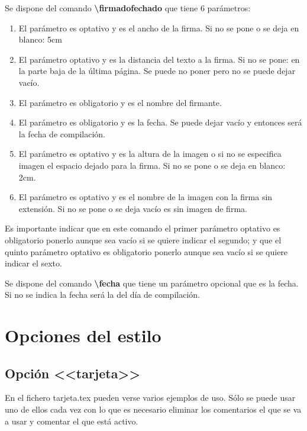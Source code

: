 \documentclass[numerado,carta]{plantillasEPS} %
\begin{document}
Se dispone del comando \textbf{{\textbackslash}firmadofechado} que tiene 6 parámetros:
\begin{enumerate}
    \item El parámetro es optativo y es el ancho de la firma. Si no se pone o se deja en blanco: 5cm
    \item El parámetro optativo y es la distancia del texto a la firma. Si no se pone: en la parte baja de la última página. Se puede no poner pero no se puede dejar vacío.
    \item El parámetro es obligatorio y es el nombre del firmante.
    \item El parámetro es obligatorio y es la fecha. Se puede dejar vacío y entonces será la fecha de compilación.
    \item El parámetro es optativo y es la altura de la imagen o si no se especifica imagen el espacio dejado para la firma. Si no se pone o se deja en blanco: 2cm.
    \item El parámetro es optativo y es el nombre de la imagen con la firma sin extensión. Si no se pone o se deja vacío es sin imagen de firma.
\end{enumerate}

Es importante indicar que en este comando el primer parámetro optativo es obligatorio ponerlo aunque sea vacío si se quiere indicar el segundo; y que el quinto parámetro optativo es obligatorio ponerlo aunque sea vacío si se quiere indicar el sexto.

Se dispone del comando \textbf{{\textbackslash}fecha} que tiene un parámetro opcional que es la fecha. Si no se indica la fecha será la del día de compilación.

\section{Opciones del estilo}
\subsection{Opción <<tarjeta>>}
En el fichero tarjeta.tex pueden verse varios ejemplos de uso. Sólo se puede usar uno de ellos cada vez con lo que es necesario eliminar los comentarios el que se va a usar y comentar el que está activo.
\end{document}
